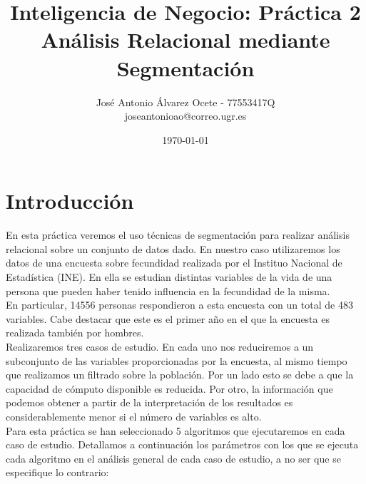 \documentclass[11pt,a4paper]{article}
\title{Inteligencia de Negocio: Práctica 2
	\\\medskip \large Análisis Relacional mediante Segmentación}
\author{José Antonio Álvarez Ocete - 77553417Q \\ joseantonioao@correo.ugr.es}
\date{ \today }
\begin{document}
	
	
	\maketitle 
	\newpage
	\tableofcontents
	\newpage
	
	\section{Introducción}
	
	En esta práctica veremos el uso técnicas de segmentación para realizar análisis relacional sobre un conjunto de datos dado. En nuestro caso utilizaremos los datos de una encuesta sobre fecundidad \cite{encuesta} realizada por el Instituo Nacional de Estadística (INE). En ella se estudian distintas variables de la vida de una persona que pueden haber tenido influencia en la fecundidad de la misma. \\
	
	En particular, 14556 personas respondieron a esta encuesta con un total de 483 variables. Cabe destacar que este es el primer año en el que la encuesta es realizada también por hombres. \\

	Realizaremos tres casos de estudio. En cada uno nos reduciremos a un subconjunto de las variables proporcionadas por la encuesta, al mismo tiempo que realizamos un filtrado sobre la población. Por un lado esto se debe a que la capacidad de cómputo disponible es reducida. Por otro, la información que podemos obtener a partir de la interpretación de los resultados es considerablemente menor si el número de variables es alto. \\
	
	Para esta práctica se han seleccionado 5 algoritmos que ejecutaremos en cada caso de estudio. Detallamos a continuación los parámetros con los que se ejecuta cada algoritmo en el análisis general de cada caso de estudio, a no ser que se especifique lo contrario:
	
\end{document}
